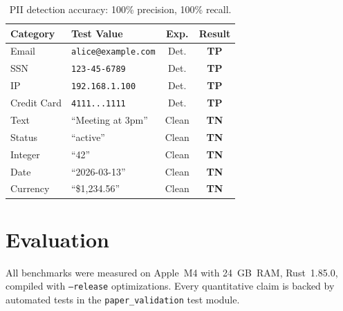 \documentclass[10pt, twocolumn]{article}
\begin{document}
\begin{table}[t]
\caption{PII detection accuracy: 100\% precision, 100\% recall.}
\label{tab:pii}
\centering\scriptsize
\begin{tabular}{@{}llcc@{}}
\toprule
\textbf{Category} & \textbf{Test Value} & \textbf{Exp.} & \textbf{Result} \\
\midrule
Email & \texttt{alice@example.com} & Det. & \textcolor{amgreen}{\textbf{TP}} \\
SSN & \texttt{123-45-6789} & Det. & \textcolor{amgreen}{\textbf{TP}} \\
IP & \texttt{192.168.1.100} & Det. & \textcolor{amgreen}{\textbf{TP}} \\
Credit Card & \texttt{4111...1111} & Det. & \textcolor{amgreen}{\textbf{TP}} \\
\midrule
Text & ``Meeting at 3pm'' & Clean & \textcolor{amgreen}{\textbf{TN}} \\
Status & ``active'' & Clean & \textcolor{amgreen}{\textbf{TN}} \\
Integer & ``42'' & Clean & \textcolor{amgreen}{\textbf{TN}} \\
Date & ``2026-03-13'' & Clean & \textcolor{amgreen}{\textbf{TN}} \\
Currency & ``\$1{,}234.56'' & Clean & \textcolor{amgreen}{\textbf{TN}} \\
\bottomrule
\end{tabular}
\end{table}


\section{Evaluation}\label{sec:evaluation}

All benchmarks were measured on Apple~M4 with 24~GB~RAM, Rust~1.85.0, compiled with \texttt{--release} optimizations. Every quantitative claim is backed by automated tests in the \texttt{paper\_validation} test module.
\end{document}
